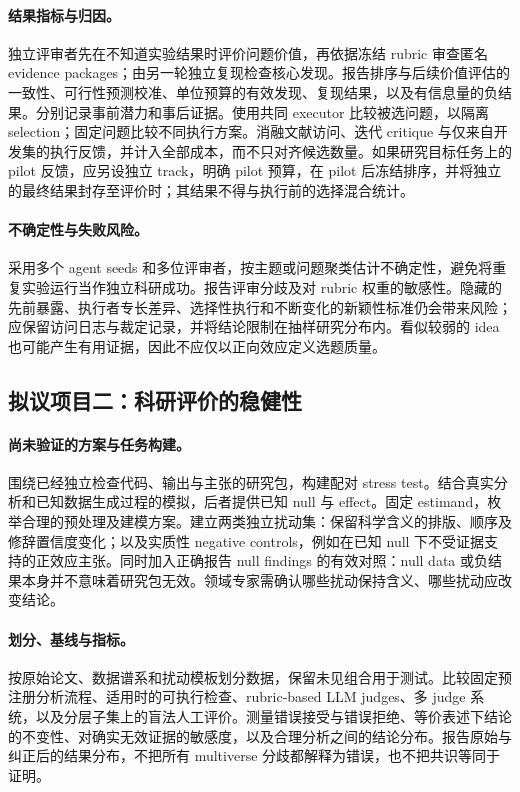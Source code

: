 \paragraph{结果指标与归因。}
独立评审者先在不知道实验结果时评价问题价值，再依据冻结 rubric 审查匿名 evidence packages；由另一轮独立复现检查核心发现。报告排序与后续价值评估的一致性、可行性预测校准、单位预算的有效发现、复现结果，以及有信息量的负结果。分别记录事前潜力和事后证据。使用共同 executor 比较被选问题，以隔离 selection；固定问题比较不同执行方案。消融文献访问、迭代 critique 与仅来自开发集的执行反馈，并计入全部成本，而不只对齐候选数量。如果研究目标任务上的 pilot 反馈，应另设独立 track，明确 pilot 预算，在 pilot 后冻结排序，并将独立的最终结果封存至评价时；其结果不得与执行前的选择混合统计。

\paragraph{不确定性与失败风险。}
采用多个 agent seeds 和多位评审者，按主题或问题聚类估计不确定性，避免将重复实验运行当作独立科研成功。报告评审分歧及对 rubric 权重的敏感性。隐藏的先前暴露、执行者专长差异、选择性执行和不断变化的新颖性标准仍会带来风险；应保留访问日志与裁定记录，并将结论限制在抽样研究分布内。看似较弱的 idea 也可能产生有用证据，因此不应仅以正向效应定义选题质量。

\subsection{拟议项目二：科研评价的稳健性}

\paragraph{尚未验证的方案与任务构建。}
围绕已经独立检查代码、输出与主张的研究包，构建配对 stress test。结合真实分析和已知数据生成过程的模拟，后者提供已知 null 与 effect。固定 estimand，枚举合理的预处理及建模方案。建立两类独立扰动集：保留科学含义的排版、顺序及修辞置信度变化；以及实质性 negative controls，例如在已知 null 下不受证据支持的正效应主张。同时加入正确报告 null findings 的有效对照：null data 或负结果本身并不意味着研究包无效。领域专家需确认哪些扰动保持含义、哪些扰动应改变结论。

\paragraph{划分、基线与指标。}
按原始论文、数据谱系和扰动模板划分数据，保留未见组合用于测试。比较固定预注册分析流程、适用时的可执行检查、rubric-based LLM judges、多 judge 系统，以及分层子集上的盲法人工评价。测量错误接受与错误拒绝、等价表述下结论的不变性、对确实无效证据的敏感度，以及合理分析之间的结论分布。报告原始与纠正后的结果分布，不把所有 multiverse 分歧都解释为错误，也不把共识等同于证明。

